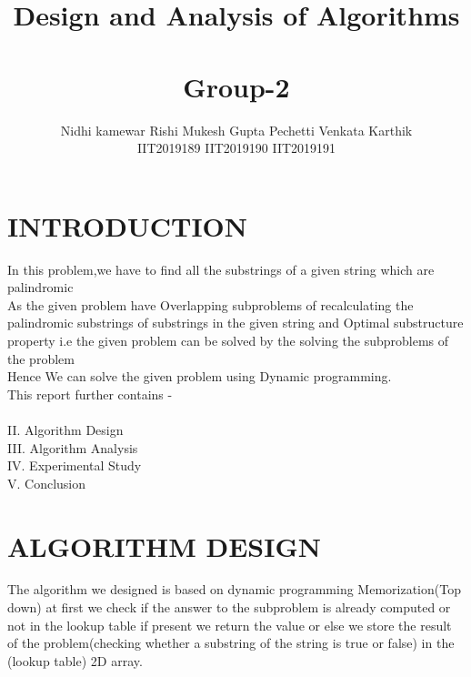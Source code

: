 \documentclass[twocolumn]{article}
\title{\vspace{-2cm} \textbf{{\myfont Design and Analysis of Algorithms}} \\
\\Group-2
}
\author{Nidhi kamewar    \: \: \:  \:     \:                         Rishi Mukesh Gupta          \: \: \:  \:     \:             Pechetti Venkata Karthik\\    

    IIT2019189     \: \: \:  \:     \:   \: \: \:  \:     \:                      IIT2019190     \: \: \:  \:     \: \:  \:    \: \:    \:                  IIT2019191    \: \: \: \:  \:     \:     


}
\begin{document}
\maketitle

\section{INTRODUCTION}
In this problem,we have to find all the substrings of a given string which are palindromic \\

As the given problem have Overlapping subproblems of recalculating the palindromic substrings of substrings in the given string and Optimal substructure property i.e the given problem can be solved by the solving the subproblems of the problem\\

Hence We can solve the given problem using Dynamic programming.\\

This report further contains -\\
\\
II. Algorithm Design \\
III. Algorithm Analysis\\
IV. Experimental Study\\
V. Conclusion\\

\section{ ALGORITHM DESIGN
}
\noindent
The algorithm we designed is based on dynamic programming Memorization(Top down) at first we check if the answer to the subproblem is already computed or not in the lookup table if present we return the value or else  we store the result of the problem(checking whether a substring of the string is true or false) in the (lookup table) 2D array.\\
\end{document}
